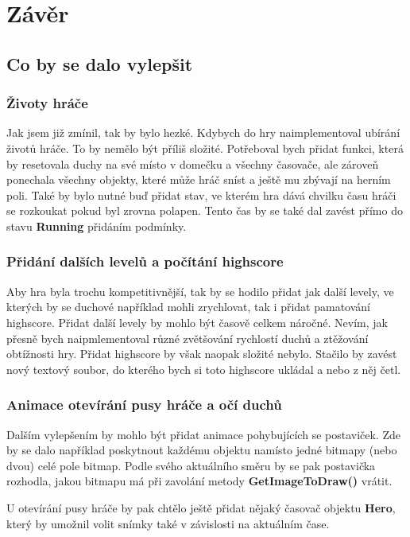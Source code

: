 \documentclass[a4]{article}
\begin{document}
\section{Závěr}
\subsection{Co by se dalo vylepšit}
\subsubsection{Životy hráče}
Jak jsem již zmínil, tak by bylo hezké. Kdybych do hry naimplementoval ubírání životů hráče. To by nemělo být příliš složité. Potřeboval bych přidat funkci, která by resetovala duchy na své místo v domečku a všechny časovače, ale zároveň ponechala všechny objekty, které může hráč sníst a ještě mu zbývají na herním poli. Také by bylo nutné buď přidat stav, ve kterém hra dává chvilku času hráči se rozkoukat pokud byl zrovna polapen. Tento čas by se také dal zavést přímo do stavu \textbf{Running} přidáním podmínky.

\subsubsection{Přidání dalších levelů a počítání highscore}
Aby hra byla trochu kompetitivnější, tak by se hodilo přidat jak další levely, ve kterých by se duchové například mohli zrychlovat, tak i přidat pamatování highscore. Přidat další levely by mohlo být časově celkem náročné. Nevím, jak přesně bych naipmlementoval různé zvětšování rychlostí duchů a ztěžování obtížnosti hry. Přidat highscore by však naopak složité nebylo. Stačilo by zavést nový textový soubor, do kterého bych si toto highscore ukládal a nebo z něj četl.

\subsubsection{Animace otevírání pusy hráče a očí duchů}
Dalším vylepšením by mohlo být přidat animace pohybujících se postaviček. Zde by se dalo například poskytnout každému objektu namísto jedné bitmapy (nebo dvou) celé pole bitmap. Podle svého aktuálního směru by se pak postavička rozhodla, jakou bitmapu má při zavolání metody \textbf{GetImageToDraw()} vrátit.

U otevírání pusy hráče by pak chtělo ještě přidat nějaký časovač objektu \textbf{Hero}, který by umožnil volit snímky také v závislosti na aktuálním čase.
\end{document}
